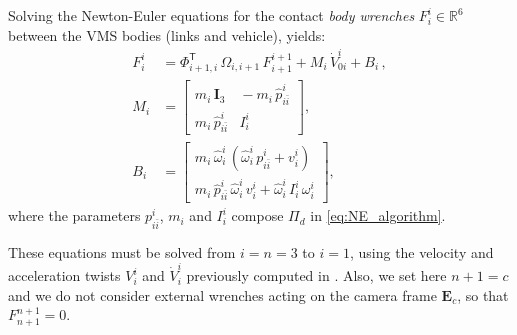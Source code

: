 \begin{algorithm}
\label{alg:backward_propagation}

%
Solving the Newton-Euler equations for the contact \textit{body wrenches} $F^{i}_{i} \in \mathbb{R}^{6}$ between the VMS bodies (links and vehicle), yields:
%
\begin{align}
\label{eq:backward_step}
F^{i}_{i} &= \Phi^\mathsf{T}_{i+1,i} \, \Omega_{i,i+1} \, F^{i+1}_{i+1} + M_{i} \, \dot{V}^{i}_{0i} + B_{i} \,, \\
%
M_{i} &= \left[\begin{array}{cc}
m_i \, \mathbf{I}_{3} \!\!&\!\! - m_i \, \hat{p}^{i}_{i\bar{i}} \\
m_i \, \hat{p}^{i}_{i\bar{i}} \!\!&\!\! I^{i}_{i}
\end{array}\right] , \nonumber \\
%
B_{i} &= \left[\begin{array}{c}
m_i \, \hat{\omega}^{i}_{i} \, ( \hat{\omega}^{i}_{i} \, p^{i}_{i\bar{i}} + v^{i}_{i} ) \\
m_i \, \hat{p}^{i}_{i\bar{i}} \, \hat{\omega}^{i}_{i} \, v^{i}_{i} +
\hat{\omega}^{i}_{i} \, I^{i}_{i} \, \omega^{i}_{i}
\end{array}\right] , \nonumber
\end{align}
%
%
where the parameters $p^{i}_{i\bar{i}}$, $m_i$ and $I^i_i$ compose $\Pi_{d}$ in \eqref{eq:NE_algorithm}. 

These equations must be solved from $i=n=3$ to $i = 1$, using the velocity and acceleration twists $V^{i}_{i}$ and $\dot{V}^{i}_{i}$ 
previously computed in .
%
%
Also, we set here $n+1 = c$ and we do not consider external wrenches acting on the camera frame $\mathbf{E}_c$, so that $F^{n+1}_{n+1} = 0$.
%
\end{algorithm}

